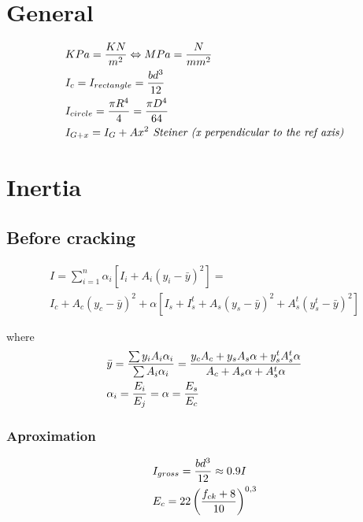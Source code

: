\documentclass[landscape]{article}
\begin{document}
\begin{multicols*}{2}

\section{General} %
\label{sec:general}
    $$
      \begin{aligned}
        & KPa = \frac{KN}{m^2} \Leftrightarrow MPa = \frac{N}{mm^2} \\
        & I_c= I_{rectangle} = \frac{bd^3}{12} \\
        & I_{circle}= \frac{\pi R^4}{4}= \frac{\pi D^4}{64}\\
        & I_{G+x} = I_G + Ax^2 \emph{ Steiner (x perpendicular to the ref axis)}
      \end{aligned}\notag
    $$


\section{Inertia} %
\label{sec:inertia}
    \subsection{Before cracking} %
    \label{sub:before_cracking}
    
\begin{multline}
  I = \sum_{i=1}^n \alpha_i\left[I_i + A_i (y_i-\bar{y})^2\right]=\\ I_c + A_c \left(y_c-\bar{y}\right)^2 + \alpha\left[I_s + I_s^t + A_s \left(y_s-\bar{y}\right)^2 + A_s^t (y_s^t-\bar{y})^2\right] 
\end{multline}

  where
    $$
      \begin{aligned}
        &\bar{y}= \frac{\sum y_i A_i \alpha_i  }{\sum  A_i \alpha_i} = \frac{y_c A_c + y_s A_s \alpha + y_s^t A_s^t \alpha  }{ A_c +  A_s \alpha +  A_s^t \alpha} \\
        & \alpha_i = \frac{E_i}{E_j} = \alpha = \frac{E_s}{E_c}
      \end{aligned}\notag
    $$


    \subsubsection{Aproximation} %
    \label{ssub:aproximation}
    $$
      \begin{aligned}
        &I_{gross}= \frac{bd^3}{12} \approx 0.9 I \\
        & E_c = 22\left(\frac{f_{ck}+8}{10}\right)^{0,3}
      \end{aligned}\notag
    $$


\end{multicols*}
\end{document}
